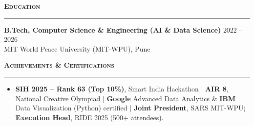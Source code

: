 \documentclass[a4paper,10pt]{article}
\newcommand{\sectionHeader}[2]{%
  \vspace{1.5pt}%
  \noindent%
  {\normalsize\bfseries\color{HeaderDark}#2\enspace\textsc{#1}}%
  \\[-6pt]%
  {\color{SectionLine}\rule{\textwidth}{1pt}}%
  \vspace{1pt}\par%
}
\newcommand{\eduEntry}[4]{%
  \vspace{1pt}%
  \noindent\textbf{\color{HeaderDark}#1} \hfill {\small\color{SubText}#2}\\[-3pt]%
  {\small\color{MidGray}#3} \hfill {\small\color{SubText}#4}%
  \vspace{0pt}\par%
}
\begin{document}

\sectionHeader{Education}{\faGraduationCap}

\eduEntry{B.Tech, Computer Science \& Engineering (AI \& Data Science)}
  {2022 -- 2026}
  {MIT World Peace University (MIT-WPU), Pune}
  {}


\sectionHeader{Achievements \& Certifications}{\faTrophy}

\begin{itemize}[leftmargin=14pt, itemsep=0pt, parsep=0pt, topsep=1pt, label={\color{BulletColor}$\bullet$}]
  \item {\small \textbf{SIH 2025 -- Rank 63 (Top 10\%)}, Smart India Hackathon {\color{SubText}|} \textbf{AIR 8}, National Creative Olympiad {\color{SubText}|} \textbf{Google} Advanced Data Analytics \& \textbf{IBM} Data Visualization (Python) certified {\color{SubText}|} \textbf{Joint President}, SARS MIT-WPU; \textbf{Execution Head}, RIDE 2025 (500+ attendees).}
\end{itemize}

\end{document}
